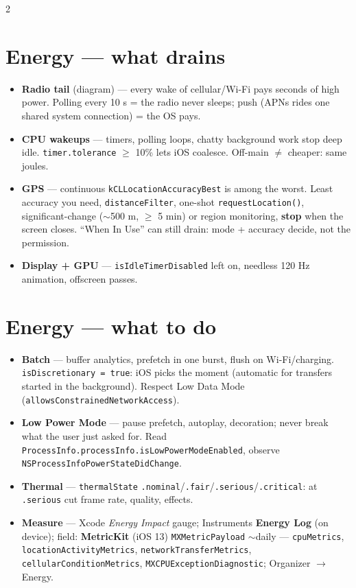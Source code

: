 \documentclass[8pt]{extarticle}
\begin{document}
\begin{multicols}{2}
\section{Energy — what drains}
\begin{itemize}
  \item \textbf{Radio tail} (diagram) — every wake of cellular/Wi-Fi pays seconds of
        high power. Polling every 10 s = the radio never sleeps; push (APNs rides one
        shared system connection) = the OS pays.
  \item \textbf{CPU wakeups} — timers, polling loops, chatty background work stop deep
        idle. \texttt{timer.tolerance} $\geq$ 10\% lets iOS coalesce. Off-main $\neq$
        cheaper: same joules.
  \item \textbf{GPS} — continuous \texttt{kCLLocationAccuracyBest} is among the worst.
        Least accuracy you need, \texttt{distanceFilter}, one-shot
        \texttt{requestLocation()}, significant-change ($\sim$500 m, $\geq$ 5 min) or region
        monitoring, \textbf{stop} when the screen closes. ``When In Use'' can still drain:
        mode + accuracy decide, not the permission.
  \item \textbf{Display + GPU} — \texttt{isIdleTimerDisabled} left on, needless 120 Hz
        animation, offscreen passes.
\end{itemize}

\section{Energy — what to do}
\begin{itemize}
  \item \textbf{Batch} — buffer analytics, prefetch in one burst, flush on
        Wi-Fi/charging. \texttt{isDiscretionary = true}: iOS picks the moment (automatic
        for transfers started in the background). Respect Low Data Mode
        (\texttt{allowsConstrainedNetworkAccess}).
  \item \textbf{Low Power Mode} — pause prefetch, autoplay, decoration; never break what
        the user just asked for. Read
        \texttt{ProcessInfo.processInfo.isLowPowerModeEnabled}, observe
        \texttt{NSProcessInfoPowerStateDidChange}.
  \item \textbf{Thermal} — \texttt{thermalState} \texttt{.nominal}/\texttt{.fair}/\texttt{.serious}/\texttt{.critical}:
        at \texttt{.serious} cut frame rate, quality, effects.
  \item \textbf{Measure} — Xcode \emph{Energy Impact} gauge; Instruments \textbf{Energy
        Log} (on device); field: \textbf{MetricKit} (iOS 13) \texttt{MXMetricPayload}
        $\sim$daily — \texttt{cpuMetrics}, \texttt{locationActivityMetrics},
        \texttt{networkTransferMetrics}, \texttt{cellularConditionMetrics},
        \texttt{MXCPUExceptionDiagnostic}; Organizer $\to$ Energy.
\end{itemize}


\end{multicols}
\end{document}
